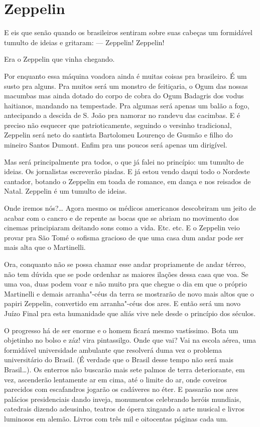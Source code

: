 
\chapter{Zeppelin}

E eis que senão quando os brasileiros sentiram sobre suas cabeças um
formidável tumulto de ideias e gritaram: --- Zeppelin! Zeppelin!

Era o Zeppelin que vinha chegando.

Por enquanto essa máquina voadora ainda é muitas coisas pra brasileiro.
É um susto pra alguns. Pra muitos será um monstro de feitiçaria, o Ogum
das nossas macumbas mas ainda dotado do corpo de cobra do Ogum Badagris
dos vodus haitianos, mandando na tempestade. Pra algumas será apenas um
balão a fogo, antecipando a descida de S. João pra namorar no randevu
das cacimbas. E é preciso não esquecer que patrioticamente, seguindo o
versinho tradicional, Zeppelin será neto do santista Bartolomeu Lourenço
de Gusmão e filho do mineiro Santos Dumont. Enfim pra uns poucos será
apenas um dirigível.

Mas será principalmente pra todos, o que já falei no princípio: um
tumulto de ideias. Os jornalistas escreverão piadas. E já estou vendo
daqui todo o Nordeste cantador, botando o Zeppelin em toada de romance,
em dança e nos reisados de Natal. Zeppelin é um tumulto de ideias.

Onde iremos nós?\ldots{} Agora mesmo os médicos americanos descobriram um
jeito de acabar com o cancro e de repente as bocas que se abriam no
movimento dos cinemas principiaram deitando sons como a vida. Etc. etc.
E o Zeppelin veio provar pra São Tomé o sofisma gracioso de que uma casa
dum andar pode ser mais alta que o Martinelli.

Ora, conquanto não se possa chamar esse andar propriamente de andar
térreo, não tem dúvida que se pode ordenhar as maiores ilações dessa
casa que voa. Se uma voa, duas podem voar e não muito pra que chegue o
dia em que o próprio Martinelli e demais arranha"-céus da terra se
mostrarão de novo mais altos que o papiri Zeppelin, convertido em
arranha"-céus dos ares. E então será um novo Juízo Final pra esta
humanidade que aliás vive nele desde o princípio dos séculos.

O progresso há de ser enorme e o homem ficará mesmo vastíssimo. Bota um
objetinho no bolso e záz! vira pintassilgo. Onde que vai? Vai na escola
aérea, uma formidável universidade ambulante que resolverá duma vez o
problema universitário do Brasil. (É verdade que o Brasil desse tempo
não será mais Brasil\ldots{}). Os enterros não buscarão mais sete palmos de
terra deteriorante, em vez, ascenderão lentamente ar em cima, até o
limite do ar, onde coveiros parecidos com escafandros jogarão os
cadáveres no éter. E passarão nos ares palácios presidenciais dando
inveja, monumentos celebrando heróis mundiais, catedrais dizendo
adeusinho, teatros de ópera xingando a arte musical e livros luminosos
em alemão. Livros com três mil e oitocentas páginas cada um.

